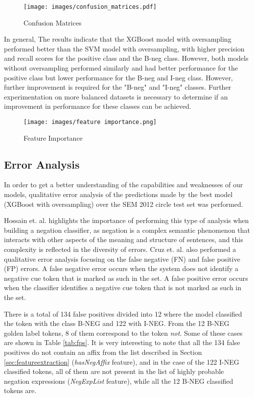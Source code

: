 \begin{figure}[!h]
    \centering
    \texttt{[image: images/confusion\_matrices.pdf]}
    \caption{Confusion Matrices}
    \label{fig:confusion_matrix}
\end{figure}

In general, The results indicate that the XGBoost model with oversampling performed better than the SVM model with oversampling, with higher precision and recall scores for the positive class and the B-neg class. However, both models without oversampling performed similarly and had better performance for the positive class but lower performance for the B-neg and I-neg class. However, further improvement is required for the "B-neg" and "I-neg" classes. Further experimentation on more balanced datasets is necessary to determine if an improvement in performance for these classes can be achieved.

\begin{figure}[!h]
    \centering
    \texttt{[image: images/feature importance.png]}
    \caption{Feature Importance}
    \label{fig:feature importance}
\end{figure}


\subsection*{Error Analysis}

In order to get a better understanding of the capabilities and weaknesses of our models, qualitative error analysis of the predictions made by the best model (XGBoost with oversampling) over the SEM 2012 circle test set was performed.

Hossain et. al. \cite{hossain2020predicting} highlights the importance of performing this type of analysis when building a negation classifier, as negation is a complex semantic phenomenon that interacts with other aspects of the meaning and structure of sentences, and this complexity is reflected in the diversity of errors. Cruz et. al. \cite{cruz2016machine} also performed a qualitative error analysis focusing on the false negative (FN) and false positive (FP) errors. A false negative error occurs when the system does not identify a negative cue token that is marked as such in the set. A false positive error occurs when the classifier identifies a negative cue token that is not marked as such in the set.

There is a total of 134 false positives divided into 12 where the model classified the token with the class B-NEG and 122 with I-NEG. From the 12 B-NEG golden label tokens, 8 of them correspond to the token \textit{not}. Some of these cases are shown in Table \ref{tab:fps}. It is very interesting to note that all the 134 false positives do not contain an affix from the list described in Section \ref{sec:featureextraction} (\textit{hasNegAffix} feature), and in the case of the 122 I-NEG classified tokens, all of them are not present in the list of highly probable negation expressions (\textit{NegExpList} feature), while all the 12 B-NEG classified tokens are.


